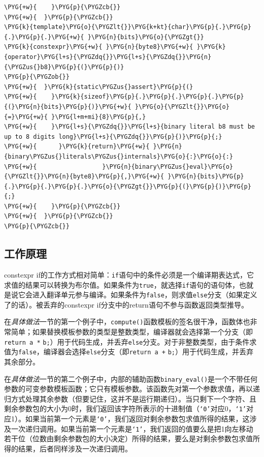 \begin{itemize}
\begin{codeblockbg}
\begin{Verbatim}[commandchars=\\\{\},breaklines=true,breakanywhere=true,fontsize=\codefont,xleftmargin=17bp]
\PYG{+w}{    }\PYG{p}{\PYGZcb{}}
\PYG{+w}{  }\PYG{p}{\PYGZcb{}}
\PYG{k}{template}\PYG{o}{\PYGZlt{}}\PYG{k+kt}{char}\PYG{p}{.}\PYG{p}{.}\PYG{p}{.}\PYG{+w}{ }\PYG{n}{bits}\PYG{o}{\PYGZgt{}}
\PYG{k}{constexpr}\PYG{+w}{ }\PYG{n}{byte8}\PYG{+w}{ }\PYG{k}{operator}\PYG{l+s}{\PYGZdq{}}\PYG{l+s}{\PYGZdq{}}\PYG{n}{\PYGZus{}b8}\PYG{p}{(}\PYG{p}{)}
\PYG{p}{\PYGZob{}}
\PYG{+w}{  }\PYG{k}{static\PYGZus{}assert}\PYG{p}{(}
\PYG{+w}{    }\PYG{k}{sizeof}\PYG{p}{.}\PYG{p}{.}\PYG{p}{.}\PYG{p}{(}\PYG{n}{bits}\PYG{p}{)}\PYG{+w}{ }\PYG{o}{\PYGZlt{}}\PYG{o}{=}\PYG{+w}{ }\PYG{l+m+mi}{8}\PYG{p}{,}
\PYG{+w}{    }\PYG{l+s}{\PYGZdq{}}\PYG{l+s}{binary literal b8 must be up to 8 digits long}\PYG{l+s}{\PYGZdq{}}\PYG{p}{)}\PYG{p}{;}
\PYG{+w}{      }\PYG{k}{return}\PYG{+w}{ }\PYG{n}{binary\PYGZus{}literals\PYGZus{}internals}\PYG{o}{:}\PYG{o}{:}
\PYG{+w}{                  }\PYG{n}{binary\PYGZus{}eval}\PYG{o}{\PYGZlt{}}\PYG{n}{byte8}\PYG{p}{,}\PYG{+w}{ }\PYG{n}{bits}\PYG{p}{.}\PYG{p}{.}\PYG{p}{.}\PYG{o}{\PYGZgt{}}\PYG{p}{(}\PYG{p}{)}\PYG{p}{;}
\PYG{+w}{    }\PYG{p}{\PYGZcb{}}
\PYG{+w}{  }\PYG{p}{\PYGZcb{}}
\PYG{p}{\PYGZcb{}}
\end{Verbatim}
\end{codeblockbg}

\end{itemize}



\subsection{工作原理}



constexpr if的工作方式相对简单：\texttt{if}语句中的条件必须是一个编译期表达式，它求值的结果可以转换为布尔值。如果条件为\texttt{true}，就选择\texttt{if}语句的语句体，也就是说它会进入翻译单元参与编译。如果条件为\texttt{false}，则求值\texttt{else}分支（如果定义了的话）。被丢弃的constexpr if分支中的return语句不参与函数返回类型推导。



在\textit{具体做法}一节的第一个例子中，\texttt{compute()}函数模板的签名很干净，函数体也非常简单；如果替换模板参数的类型是整数类型，编译器就会选择第一个分支（即\texttt{return a *} \texttt{b;}）用于代码生成，并丢弃\texttt{else}分支。对于非整数类型，由于条件求值为\texttt{false}，编译器会选择\texttt{else}分支（即\texttt{return a +} \texttt{b;}）用于代码生成，并丢弃其余部分。


在\textit{具体做法}一节的第二个例子中，内部的辅助函数\texttt{binary\_\allowbreak{}eval()}是一个不带任何参数的可变参数模板函数；它只有模板参数。该函数先对第一个参数求值，再以递归方式处理其余参数（但要记住，这并不是运行期递归）。当只剩下一个字符、且剩余参数包的大小为0时，我们返回该字符所表示的十进制值（\texttt{‘0’}对应0，\texttt{‘1’}对应1）。如果当前第一个元素是\texttt{‘0’}，我们返回对剩余参数包求值所得的结果，这涉及一次递归调用。如果当前第一个元素是\texttt{‘1’}，我们返回的值要么是把1向左移动若干位（位数由剩余参数包的大小决定）所得的结果，要么是对剩余参数包求值所得的结果，后者同样涉及一次递归调用。


